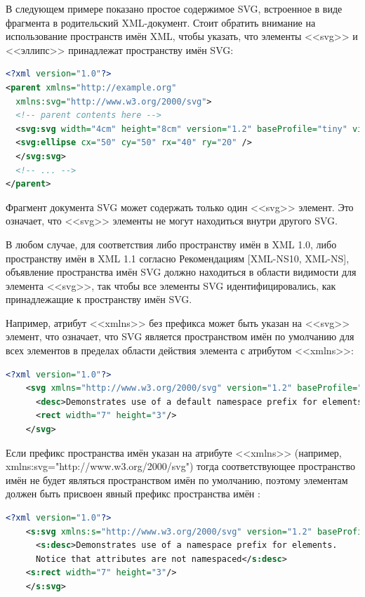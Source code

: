 В следующем примере показано простое содержимое SVG, встроенное в виде фрагмента в родительский XML-документ. Стоит обратить внимание на использование пространств имён XML, чтобы указать, что элементы <<svg>> и <<эллипс>> принадлежат пространству имён SVG:
\begin{lstlisting}[language=XML,label=list:xml]
<?xml version="1.0"?>
<parent xmlns="http://example.org"
  xmlns:svg="http://www.w3.org/2000/svg">
  <!-- parent contents here -->
  <svg:svg width="4cm" height="8cm" version="1.2" baseProfile="tiny" viewBox="0 0 100 100">
  <svg:ellipse cx="50" cy="50" rx="40" ry="20" />
  </svg:svg>
  <!-- ... -->
</parent>
\end{lstlisting}

Фрагмент документа SVG может содержать только один <<svg>> элемент. Это означает, что <<svg>> элементы не могут находиться внутри другого SVG.

В любом случае, для соответствия либо пространству имён в XML 1.0, либо пространству имён в XML 1.1 согласно Рекомендациям [XML-NS10, XML-NS], объявление пространства имён SVG должно находиться в области видимости для элемента <<svg>>, так чтобы все элементы SVG идентифицировались, как принадлежащие к пространству имён SVG.

Например, атрибут <<xmlns>> без префикса может быть указан на <<svg>> элемент, что означает, что SVG является пространством имён по умолчанию для всех элементов в пределах области действия элемента с атрибутом <<xmlns>>:
\begin{lstlisting}[language=XML,label=list:xml]
	<?xml version="1.0"?>
	<svg xmlns="http://www.w3.org/2000/svg" version="1.2" baseProfile="tiny">
	  <desc>Demonstrates use of a default namespace prefix for elements.</desc>
	  <rect width="7" height="3"/>
	</svg>
\end{lstlisting}

Если префикс пространства имён указан на атрибуте <<xmlns>> (например, xmlns:svg="http://www.w3.org/2000/svg") тогда соответствующее пространство имён не будет являться пространством имён по умолчанию, поэтому элементам должен быть присвоен явный префикс пространства имён \cite{andersson2008scalable}:
\begin{lstlisting}[language=XML,label=list:xml]
	<?xml version="1.0"?>
	<s:svg xmlns:s="http://www.w3.org/2000/svg" version="1.2" baseProfile="tiny">
	  <s:desc>Demonstrates use of a namespace prefix for elements.
	  Notice that attributes are not namespaced</s:desc>
	<s:rect width="7" height="3"/>
	</s:svg>
\end{lstlisting}

